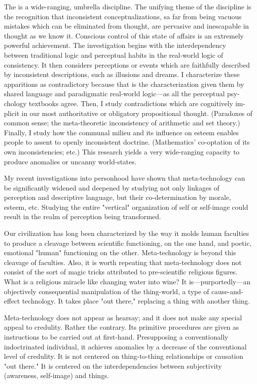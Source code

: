The  is a wide-ranging, umbrella discipline. The unifying 
theme of the discipline is the recognition that inconsistent conceptualizations, sa 
far from being vacuous mistakes which can be eliminated from thought, are 
pervasive and inescapable in thought as we know it. Conscious control of this state 
of affairs is an extremely powerful achievement. The investigation begins with the 
interdependency between traditional logic and perceptual habits in the real-world 
logic of consistency. It then considers perceptions or events which are faithfully 
described by inconsistent descriptions, such as illusions and dreams. I characterize 
these apparitions as contradictory because that is the characterization given them 
by shared language and paradigmatic real-world logic---as all the perceptual psy- 
chology textbooks agree. Then, I study contradictions which are cognitively im- 
plicit in our most authoritative or obligatory propositional thought. (Paradoxes of 
common sense; the meta-theoretic inconsistency of arithmetic and set theory.) 
Finally, I study how the communal milieu and its influence on esteem enables 
people to assent to openly inconsistent doctrine. (Mathematics' co-optation of its 
own inconsistencies; etc.) This research yields a very wide-ranging capacity to 
produce anomalies or uncanny world-states. 

My recent investigations into personhood have shown that meta-technology can 
be significantly widened and deepened by studying not only linkages of perception 
and descriptive language, but their co-determination by morale, esteem, etc. 
Studying the entire "vertical" organization of self or self-image could result in the 
realm of perception being transformed. 

\visbreak

Our civilization has long been characterized by the way it molds human faculties 
to produce a cleavage between scientific functioning, on the one hand, and poetic, 
emotional "human" functioning on the other. Meta-technology is beyond this 
cleavage of faculties. Also, it is worth repeating that meta-technology does not 
consist of the sort of magic tricks attributed to pre-scientific religious figures. What 
is a religious miracle like changing water into wine? It is---purportedly---an objectively 
consequential manipulation of the thing-world, a type of cause-and-effect 
technology. It takes place "out there," replacing a thing with another thing. 

Meta-technology does not appear as hearsay; and it does not make any special 
appeal to credulity. Rather the contrary. Its primitive procedures are given as 
instructions to be carried out at first-hand. Presupposing a conventionally 
indoctrinated individual, it achieves anomalies by a decrease of the conventional level of 
credulity. It is not centered on thing-to-thing relationships or causation "out there." 
It is centered on the interdependencies between subjectivity (awareness, self-image) and things. 

